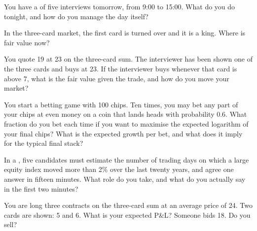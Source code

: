 \begin{interviewq}\label{iq:iv:the-final-round-and-trading-games:2}
You have a  of five interviews tomorrow, from 9:00 to 15:00. What do you do tonight, and how do you
manage the day itself?
\end{interviewq}

\begin{interviewq}\label{iq:iv:the-final-round-and-trading-games:3}
In the three-card market, the first card is turned over and it is a king. Where is fair value now?
\end{interviewq}

\begin{interviewq}\label{iq:iv:the-final-round-and-trading-games:4}
You quote 19 at 23 on the three-card sum. The interviewer has been shown one of the three cards and buys at
23. If the interviewer buys whenever that card is above 7, what is the fair value given the trade, and how do
you move your market?
\end{interviewq}

\begin{interviewq}\label{iq:iv:the-final-round-and-trading-games:5}
You start a betting game with 100 chips. Ten times, you may bet any part of your chips at even money on a coin
that lands heads with probability 0.6. What fraction do you bet each time if you want to maximise the
expected logarithm of your final chips? What is the expected growth per bet, and what does it imply for the
typical final stack?
\end{interviewq}

\begin{interviewq}\label{iq:iv:the-final-round-and-trading-games:6}
In a , five candidates must estimate the number of trading days on which a large equity index
moved more than 2\% over the last twenty years, and agree one answer in fifteen minutes. What role do you take,
and what do you actually say in the first two minutes?
\end{interviewq}

\begin{interviewq}\label{iq:iv:the-final-round-and-trading-games:7}
You are long three contracts on the three-card sum at an average price of 24. Two cards are shown: 5 and 6.
What is your expected P\&L? Someone bids 18. Do you sell?
\end{interviewq}

